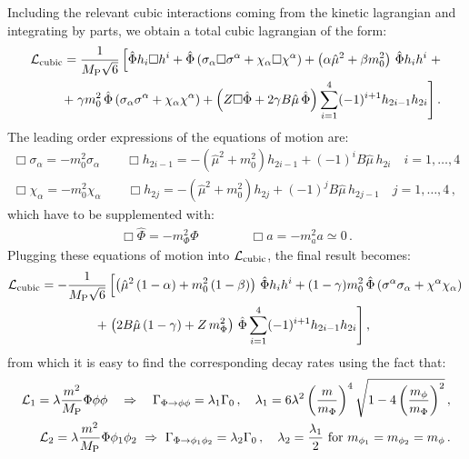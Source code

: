 \documentclass[12pt,a4paper]{book}
\def\nn{\nonumber}
\def\nn{\nonumber}
\newcommand{\mc}{\mathcal}
\begin{document}
Including the relevant cubic interactions coming from the kinetic lagrangian and integrating by parts, we obtain a total cubic lagrangian of the form:
\begin{align}
\mc{L}_{\rm cubic} = \frac{1}{M_{\rm P}\sqrt{6}} \left[ \hat \Phi h_i \Box h^i + \hat \Phi \left(\sigma_\alpha \Box \sigma^\alpha + \chi_\alpha \Box \chi^\alpha \right) + \left(\alpha \hat{\mu}^2 + \beta m_0^2 \right) \, \hat \Phi h_i h^i\right. + \nn \\
+ \left. \gamma m_0^2 \, \hat \Phi \left(\sigma_\alpha\sigma^\alpha + \chi_\alpha\chi^\alpha\right)+\left(Z \Box \hat \Phi + 2\gamma B\hat{\mu} \, \hat\Phi\right) \sum_{i=1}^4 (-1)^{i+1}h_{2i-1}h_{2i}\right]. \nn
\end{align}
The leading order expressions of the equations of motion are:
\begin{align}
\Box \sigma_\alpha = - m_0^2 \sigma_\alpha \qquad 
\Box h_{2i-1} =  - \left(\hat{\mu}^2 + m_0^2 \right) h_{2i-1} + (-1)^i B\hat{\mu} \, h_{2i} \quad i=1,\dots,4 \nn \\
\Box \chi_\alpha = - m_0^2 \chi_\alpha \qquad
\Box h_{2j} =  - \left(\hat{\mu}^2 + m_0^2 \right) h_{2j} + (-1)^j B\hat{\mu} \, h_{2j-1} \quad j=1,\dots,4 \,, \nn
\end{align}
which have to be supplemented with:
\begin{align}
\Box \hat \Phi = - m_{\Phi}^2 \hat \Phi \qquad \qquad \Box a = - m_a^2 a \simeq 0\,.
\end{align}
Plugging these equations of motion into $\mc{L}_{\rm cubic}$, the final result becomes:
\begin{align}
\mc{L}_{\rm cubic} = - \frac{1}{M_{\rm P}\sqrt{6}} &\left[\left(\hat{\mu}^2 \left(1 - \alpha\right) + m_0^2 \left(1 - \beta \right)\right) \, \hat\Phi h_i h^i 
+ (1 - \gamma) m_0^2 \, \hat \Phi \left(\sigma^\alpha\sigma_\alpha + \chi^\alpha\chi_\alpha\right)\right. \nn \\
+& \left. \left(2 B\hat{\mu} \left(1 - \gamma \right) + Z\, m_\Phi^2 \right)\, \hat\Phi \sum_{i=1}^4 (-1)^{i+1}h_{2i-1}h_{2i}\right],
\label{finallagr}
\end{align}
from which it is easy to find the corresponding decay rates using the fact that: 
\begin{align}
\mc{L}_1 = \lambda \frac{m^2}{M_{\rm P}}\Phi \phi \phi \quad\Rightarrow \quad
\Gamma_{\Phi \rightarrow \phi \phi} = \lambda_1 \Gamma_0 \,,\quad \lambda_1 = 6\lambda^2\left(\frac{m}{m_{\Phi}}\right)^4 \sqrt{1 - 4 \left(\frac{m_\phi}{m_{\Phi}}\right)^2}\,, \label{dw1} \\
\mc{L}_2 = \lambda \frac{m^2}{M_{\rm P}}\Phi \phi_1 \phi_2\,\,\Rightarrow \,\,
\Gamma_{\Phi \rightarrow \phi_1 \phi_2} = \lambda_2 \Gamma_0\,, \quad \lambda_2 = \frac{\lambda_1}{2}\,\,\text{for}\,\, m_{\phi_1} = m_{\phi_2} = m_\phi\,.
\label{dw2}
\end{align}
\end{document}
